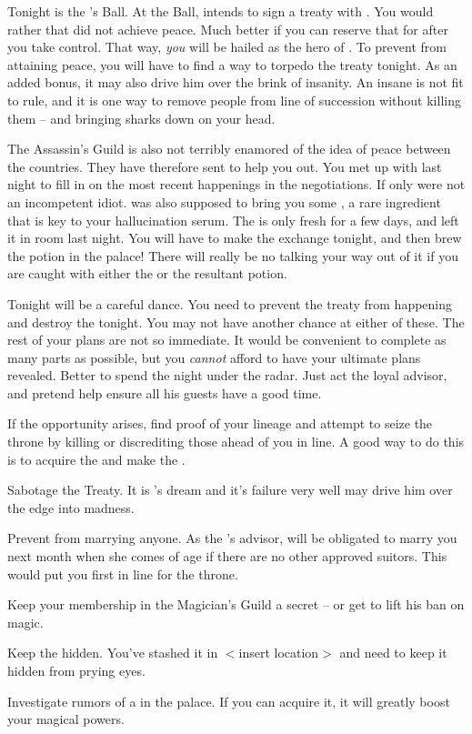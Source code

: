 \documentclass[char]{NeptuneBall}
\begin{document}
Tonight is the \cExExKing{}'s Ball. At the Ball, \cKing{\King} \cKing{} intends to sign a treaty with \pPacifica{}. You would rather that \cKing{} did not achieve peace. Much better if you can reserve that for after you take control. That way, \emph{you} will be hailed as the hero of \pAtlantis{}. To prevent \cKing{} from attaining peace, you will have to find a way to torpedo the treaty tonight. As an added bonus, it may also drive him over the brink of insanity. An insane \cKing{\King} is not fit to rule, and it is one way to remove people from line of succession without killing them -- and bringing sharks down on your head.

The Assassin's Guild is also not terribly enamored of the idea of peace between the countries. They have therefore sent \cSpy{} to help you out. You met up with \cSpy{\them} last night to fill \cSpy{\them} in on the most recent happenings in the negotiations. If only \cSpy{} were not an incompetent idiot.  \cSpy{\They} was also supposed to bring you some \iHemlock{\MYname}, a rare ingredient that is key to your hallucination serum. The \iHemlock{\MYname} is only fresh for a few days, and \cSpy{} left it in \cSpy{\them} room last night. You will have to make the exchange tonight, and then brew the potion in the palace! There will really be no talking your way out of it if you are caught with either the \iHemlock{\MYname} or the resultant potion.

Tonight will be a careful dance. You need to prevent the treaty from happening and destroy the \iMusicBox{} tonight. You may not have another chance at either of these. The rest of your plans are not so immediate. It would be convenient to complete as many parts as possible, but you \emph{cannot} afford to have your ultimate plans revealed. Better to spend the night under the radar. Just act the loyal advisor, and pretend help \cKing{} ensure all his guests have a good time.


\begin{itemz}[Goals]
  \item If the opportunity arises, find proof of your lineage and attempt to seize the throne by killing or discrediting those ahead of you in line. A good way to do this is to acquire the \iHemlock{} and make the \iShapeshifterPotion{}.
  \item Sabotage the Treaty. It is \cKing{}'s dream and it's failure very well may drive him over the edge into madness.
  \item Prevent \cPrincess{} from marrying anyone. As the \cKing{\King}'s advisor, \cPrincess{\they} will be obligated to marry you next month when she comes of age if there are no other approved suitors. This would put you first in line for the throne.
  \item Keep your membership in the Magician's Guild a secret -- or get \cKing{\King} \cKing{} to lift his ban on magic.
  \item Keep the \iMusicBox{} hidden. You've stashed it in $<$insert location$>$ and need to keep it hidden from prying eyes.
  \item Investigate rumors of a \iGlowShell{\MYname} in the palace. If you can acquire it, it will greatly boost your magical powers.
\end{itemz}
\end{document}
